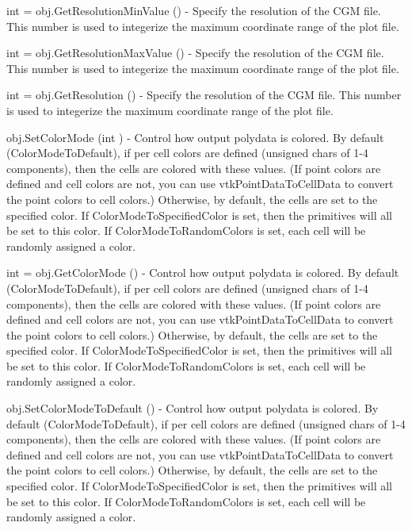 \begin{DoxyItemize}
\item {\ttfamily int = obj.\-Get\-Resolution\-Min\-Value ()} -\/ Specify the resolution of the C\-G\-M file. This number is used to integerize the maximum coordinate range of the plot file.  
\item {\ttfamily int = obj.\-Get\-Resolution\-Max\-Value ()} -\/ Specify the resolution of the C\-G\-M file. This number is used to integerize the maximum coordinate range of the plot file.  
\item {\ttfamily int = obj.\-Get\-Resolution ()} -\/ Specify the resolution of the C\-G\-M file. This number is used to integerize the maximum coordinate range of the plot file.  
\item {\ttfamily obj.\-Set\-Color\-Mode (int )} -\/ Control how output polydata is colored. By default (Color\-Mode\-To\-Default), if per cell colors are defined (unsigned chars of 1-\/4 components), then the cells are colored with these values. (If point colors are defined and cell colors are not, you can use vtk\-Point\-Data\-To\-Cell\-Data to convert the point colors to cell colors.) Otherwise, by default, the cells are set to the specified color. If Color\-Mode\-To\-Specified\-Color is set, then the primitives will all be set to this color. If Color\-Mode\-To\-Random\-Colors is set, each cell will be randomly assigned a color.  
\item {\ttfamily int = obj.\-Get\-Color\-Mode ()} -\/ Control how output polydata is colored. By default (Color\-Mode\-To\-Default), if per cell colors are defined (unsigned chars of 1-\/4 components), then the cells are colored with these values. (If point colors are defined and cell colors are not, you can use vtk\-Point\-Data\-To\-Cell\-Data to convert the point colors to cell colors.) Otherwise, by default, the cells are set to the specified color. If Color\-Mode\-To\-Specified\-Color is set, then the primitives will all be set to this color. If Color\-Mode\-To\-Random\-Colors is set, each cell will be randomly assigned a color.  
\item {\ttfamily obj.\-Set\-Color\-Mode\-To\-Default ()} -\/ Control how output polydata is colored. By default (Color\-Mode\-To\-Default), if per cell colors are defined (unsigned chars of 1-\/4 components), then the cells are colored with these values. (If point colors are defined and cell colors are not, you can use vtk\-Point\-Data\-To\-Cell\-Data to convert the point colors to cell colors.) Otherwise, by default, the cells are set to the specified color. If Color\-Mode\-To\-Specified\-Color is set, then the primitives will all be set to this color. If Color\-Mode\-To\-Random\-Colors is set, each cell will be randomly assigned a color.  

\end{DoxyItemize}
